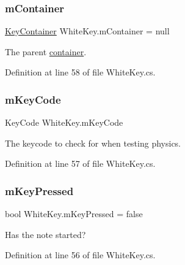 \subsubsection{\texorpdfstring{m\+Container}{mContainer}}
{\footnotesize\ttfamily \hyperlink{class_key_container}{Key\+Container} White\+Key.\+m\+Container = null\hspace{0.3cm}{\ttfamily [private]}}



The parent \hyperlink{group___doc_key_contain}{container}. 



Definition at line 58 of file White\+Key.\+cs.

\mbox{\label{group___white_key_priv_var_gaeb8c5eafd138c45894858554f739eaf7}} 
\subsubsection{\texorpdfstring{m\+Key\+Code}{mKeyCode}}
{\footnotesize\ttfamily Key\+Code White\+Key.\+m\+Key\+Code\hspace{0.3cm}{\ttfamily [private]}}



The keycode to check for when testing physics. 



Definition at line 57 of file White\+Key.\+cs.

\mbox{\label{group___white_key_priv_var_gae2501ace0af5e1313147504bf61bf3e9}} 
\subsubsection{\texorpdfstring{m\+Key\+Pressed}{mKeyPressed}}
{\footnotesize\ttfamily bool White\+Key.\+m\+Key\+Pressed = false\hspace{0.3cm}{\ttfamily [private]}}



Has the note started? 



Definition at line 56 of file White\+Key.\+cs.


